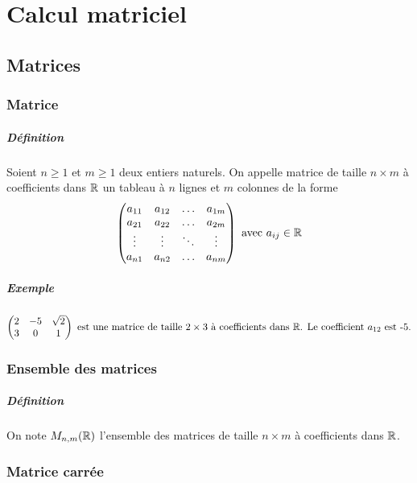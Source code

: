 \chapter{Calcul matriciel}

%
%
\section{Matrices}
%
%

%
\subsection{Matrice}
%
\paragraph{Définition} Soient $n \geq 1$ et $m \geq 1$ deux entiers naturels. On appelle matrice de taille $n\times m$ à coefficients dans $\mathbb{R}$ un tableau à $n$ lignes et $m$ colonnes de la forme
$$\begin{pmatrix}
  a_{11} & a_{12} & \ldots & a_{1m} \\
  a_{21} & a_{22} & \ldots & a_{2m} \\
  \vdots & \vdots & \ddots & \vdots \\
  a_{n1} & a_{n2} & \ldots & a_{nm}
\end{pmatrix} \text{ avec } a_{ij} \in \mathbb{R}$$

\paragraph{Exemple}
$$\begin{pmatrix}
  2 & -5 & \sqrt{2} \\
  3 &0 & 1 \\
\end{pmatrix} \text{ est une matrice de taille $2\times 3$ à coefficients dans $\mathbb{R}$. Le coefficient $a_{12}$ est -5.} $$

%
\subsection{Ensemble des matrices}
%
\paragraph{Définition} On note $M_{n, m}(\mathbb{R})$ l'ensemble des matrices de taille $n\times m$ à coefficients dans $\mathbb{R}$.

%
\subsection{Matrice carrée}
%
